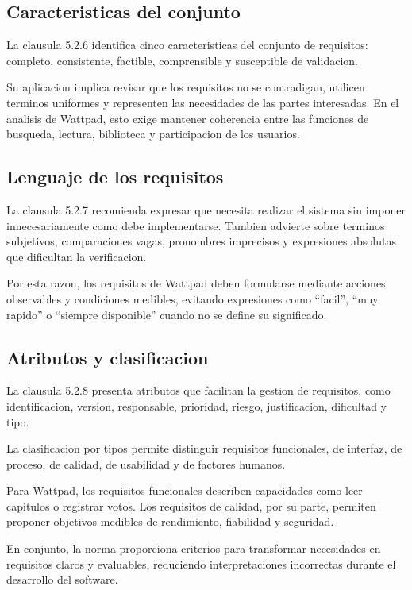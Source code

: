 \documentclass[11pt,a4paper]{article}
\begin{document}
\subsection{Caracteristicas del conjunto}

La clausula 5.2.6 identifica cinco
caracteristicas del conjunto de requisitos:
completo, consistente, factible,
comprensible y susceptible de validacion.

Su aplicacion implica revisar que los
requisitos no se contradigan, utilicen
terminos uniformes y representen las
necesidades de las partes interesadas.
En el analisis de Wattpad, esto exige
mantener coherencia entre las funciones
de busqueda, lectura, biblioteca y
participacion de los usuarios.

\subsection{Lenguaje de los requisitos}

La clausula 5.2.7 recomienda expresar
que necesita realizar el sistema sin
imponer innecesariamente como debe
implementarse. Tambien advierte sobre
terminos subjetivos, comparaciones vagas,
pronombres imprecisos y expresiones
absolutas que dificultan la verificacion.

Por esta razon, los requisitos de Wattpad
deben formularse mediante acciones
observables y condiciones medibles,
evitando expresiones como ``facil'',
``muy rapido'' o ``siempre disponible''
cuando no se define su significado.

\subsection{Atributos y clasificacion}

La clausula 5.2.8 presenta atributos
que facilitan la gestion de requisitos,
como identificacion, version, responsable,
prioridad, riesgo, justificacion,
dificultad y tipo.

La clasificacion por tipos permite
distinguir requisitos funcionales,
de interfaz, de proceso, de calidad,
de usabilidad y de factores humanos.

Para Wattpad, los requisitos funcionales
describen capacidades como leer capitulos
o registrar votos. Los requisitos de
calidad, por su parte, permiten proponer
objetivos medibles de rendimiento,
fiabilidad y seguridad.

En conjunto, la norma proporciona
criterios para transformar necesidades
en requisitos claros y evaluables,
reduciendo interpretaciones incorrectas
durante el desarrollo del software.
\end{document}
